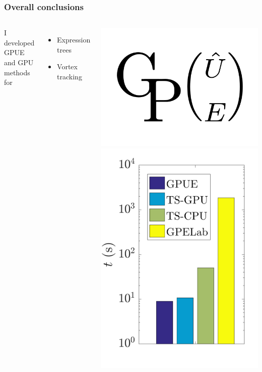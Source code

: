 \documentclass{beamer}
\begin{document}
\begin{frame}
\frametitle{Overall conclusions}

\begin{columns}
I developed GPUE and GPU methods for
\begin{itemize}
\item Expression trees
\item Vortex tracking
\end{itemize}
\includegraphics[width=\textwidth]{GPUE.png}
\includegraphics[width=\textwidth]{bench.png}
\end{columns}


\end{frame}
\end{document}
